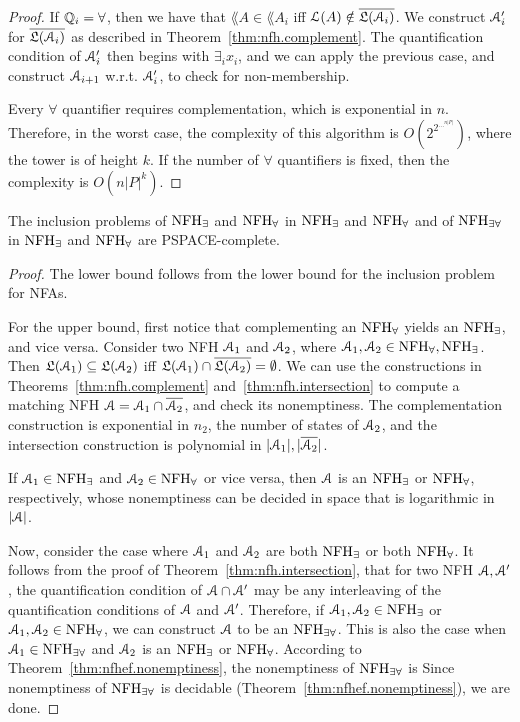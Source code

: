 \begin{proof}
If $\mathbb{Q}_i = \forall$, then we have that $\lang{A}\in \lang{A_i}$ iff 
$\mathcal{L}(A)\notin \overline{\mathfrak{L}(\mathcal{A}_i)}$. We construct $\mathcal{A}'_{i}$ for 
$\overline{\mathfrak{L}(\mathcal{A}_i)}$ as described in Theorem~\ref{thm:nfh.complement}. The 
quantification condition of $\mathcal{A}'_{i}$ then begins with $\exists_i x_i$, and we 
can apply the previous case, and construct $\mathcal{A}_{i+1}$ w.r.t. $\mathcal{A}'_{i}$, to check for non-membership.

Every $\forall$ quantifier requires complementation, which is exponential in $n$. Therefore, in the worst case, the complexity of this algorithm is $O(2^{2^{...^{n|P|}}})$, where the tower is of height $k$. If the number of $\forall$ quantifiers is fixed, then the complexity is $O(n|P|^k)$. 

\end{proof}


\begin{theorem}
The inclusion problems of $\textrm{NFH}_{\exists}$ and $\textrm{NFH}_{\forall}$ in $\textrm{NFH}_{\exists}$ and $\textrm{NFH}_{\forall}$ and of $\textrm{NFH}_{\exists\forall}$ in $\textrm{NFH}_{\exists}$ and $\textrm{NFH}_{\forall}$ are PSPACE-complete.
\end{theorem}
\begin{proof}
The lower bound follows from the lower bound for the inclusion problem for NFAs. 

For the upper bound, first notice that complementing an $\textrm{NFH}_{\forall}$ yields an $\textrm{NFH}_{\exists}$, and vice versa. 
Consider two NFH $\mathcal{A}_1$ and $\mathcal{A}_2$, where $\mathcal{A}_1,\mathcal{A}_2\in\textrm{NFH}_{\forall},\textrm{NFH}_{\exists}$. 
Then $\mathfrak{L}(\mathcal{A}_1)\subseteq\mathfrak{L}(\mathcal{A}_2)$ iff $\mathfrak{L}(\mathcal{A}_1)\cap\overline{\mathfrak{L}(\mathcal{A}_2)}  =  \emptyset$. 
We can use the constructions in Theorems~\ref{thm:nfh.complement} and~\ref{thm:nfh.intersection} to compute a matching NFH $\mathcal{A} = \mathcal{A}_1\cap\overline{\mathcal{A}_2}$, and check its nonemptiness.
The complementation construction is exponential in $n_2$, the number of states of $\mathcal{A}_2$, and the intersection construction is polynomial in $|\mathcal{A}_1|, |\overline{\mathcal{A}_2}|$. 

If $\mathcal{A}_1\in\textrm{NFH}_{\exists}$ and $\mathcal{A}_2\in\textrm{NFH}_{\forall}$ or vice versa, then $\mathcal{A}$ is an $\textrm{NFH}_{\exists}$ or $\textrm{NFH}_{\forall}$, respectively, whose nonemptiness can be decided in space that is logarithmic in $|\mathcal{A}|$. 

Now, consider the case where $\mathcal{A}_1$ and $\mathcal{A}_2$ are both $\textrm{NFH}_{\exists}$ or both $\textrm{NFH}_{\forall}$.
It follows from the proof of Theorem~\ref{thm:nfh.intersection}, that for two NFH $\mathcal{A},\mathcal{A}'$, the quantification condition of $\mathcal{A}\cap\mathcal{A}'$ may be any interleaving of the quantification conditions of $\mathcal{A}$ and $\mathcal{A}'$. Therefore, if $\mathcal{A}_1,\mathcal{A}_2\in\textrm{NFH}_{\exists}$ or $\mathcal{A}_1,\mathcal{A}_2\in\textrm{NFH}_{\forall}$, we can construct $\mathcal{A}$ to be an $\textrm{NFH}_{\exists\forall}$. 
This is also the case when $\mathcal{A}_1\in\textrm{NFH}_{\exists\forall}$ and $\mathcal{A}_2$ is an $\textrm{NFH}_{\exists}$ or $\textrm{NFH}_{\forall}$.
According to Theorem~\ref{thm:nfhef.nonemptiness}, the nonemptiness of $\textrm{NFH}_{\exists\forall}$ is 
Since nonemptiness of $\textrm{NFH}_{\exists\forall}$ is decidable (Theorem~\ref{thm:nfhef.nonemptiness}), we are done. 
\end{proof}

